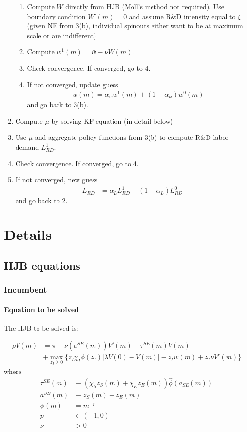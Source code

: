 \documentclass[12pt,english]{article}
\theoremstyle{remark}
\begin{document}
\begin{enumerate}
\begin{enumerate}
		\item Compute $W$ directly from HJB (Moll's method not required). Use boundary condition $W'(\bar{m}) = 0$ and assume R\&D intensity equal to $\xi$ (given NE from 3(b), individual spinouts either want to be at maximum scale or are indifferent)
		\item Compute $w^1(m) =  \bar{w} - \nu W(m)$.
		\item Check convergence. If converged, go to 4. 
		\item If not converged, update guess 
		\begin{align*}
			w(m) = \alpha_w w^1(m) + (1-\alpha_w) w^0 (m) 
		\end{align*} 
		and go back to 3(b).
	\end{enumerate}
	\item Compute $\mu$ by solving KF equation (in detail below) 
	\item Use $\mu$ and aggregate policy functions from 3(b) to compute R\&D labor demand $L^1_{RD}$.
	\item Check convergence. If converged, go to 4. 
	\item If not converged, new guess
	\begin{align*}
	L_{RD} &= \alpha_L L^1_{RD} + (1-\alpha_L) L^0_{RD} 
	\end{align*}
	and go back to 2. 
\end{enumerate}

\section{Details}

\subsection{HJB equations}

\subsubsection{Incumbent}

\paragraph{Equation to be solved}The HJB to be solved is: 

\begin{align*}
	\rho V(m) &= \pi + \nu (a^{SE}(m))V'(m) - \tau^{SE}(m) V(m) \\
							   &+ \max_{z_I \ge 0} \Big\{ z_I \chi_I \phi(z_I) \big[ \lambda V(0) - V(m) \big] - z_I w(m) + z_I \nu  V'(m) \Big\}
\end{align*}
where
\begin{align*}
	\tau^{SE}(m) &\equiv (\chi_S z_S(m) + \chi_E z_E(m)) \hat{\phi}(a_{SE}(m)) \\
	a^{SE}(m) &\equiv z_S(m) + z_E(m) \\
	\phi(m) &= m^{-p} \\
	p &\in (-1,0) \\
	\nu &> 0
\end{align*}
\end{document}

